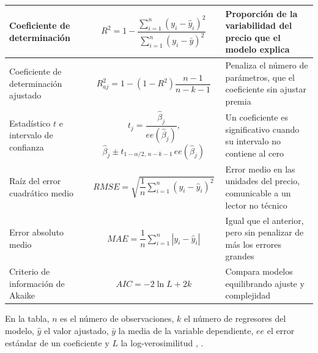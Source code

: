 \begin{strip}
\begin{center}
\begin{tabular}{|>{\raggedright\arraybackslash}p{3.3cm}|c|
                                >{\raggedright\arraybackslash}p{5.2cm}|}
                    \hline
                    Coeficiente de determinación &
                    $R^{2} = 1 - \dfrac{\sum_{i=1}^{n} (y_{i} - \hat{y}_{i})^{2}}
                    {\sum_{i=1}^{n} (y_{i} - \bar{y})^{2}}$ &
                    Proporción de la variabilidad del precio que el modelo
                    explica \\
                    \hline
                    Coeficiente de determinación ajustado &
                    $R^{2}_{aj} = 1 - (1 - R^{2}) \dfrac{n - 1}{n - k - 1}$ &
                    Penaliza el número de parámetros, que el coeficiente sin
                    ajustar premia \\
                    \hline
                    Estadístico $t$ e intervalo de confianza &
                    $t_{j} = \dfrac{\hat{\beta}_{j}}{ee(\hat{\beta}_{j})}$, \quad
                    $\hat{\beta}_{j} \pm t_{1-\alpha/2,\,n-k-1}\,
                    ee(\hat{\beta}_{j})$ &
                    Un coeficiente es significativo cuando su intervalo no contiene
                    al cero \\
                    \hline
                    Raíz del error cuadrático medio &
                    $RMSE = \sqrt{\dfrac{1}{n} \sum_{i=1}^{n}
                    (y_{i} - \hat{y}_{i})^{2}}$ &
                    Error medio en las unidades del precio, comunicable a un lector
                    no técnico \\
                    \hline
                    Error absoluto medio &
                    $MAE = \dfrac{1}{n} \sum_{i=1}^{n} |y_{i} - \hat{y}_{i}|$ &
                    Igual que el anterior, pero sin penalizar de más los errores
                    grandes \\
                    \hline
                    Criterio de información de Akaike &
                    $AIC = -2 \ln L + 2k$ &
                    Compara modelos equilibrando ajuste y complejidad \\
                    \hline
                \end{tabular}
            \end{center}
        \end{strip}

        En la tabla, $n$ es el número de observaciones, $k$ el número de
        regresores del modelo, $\hat{y}$ el valor ajustado, $\bar{y}$ la media de
        la variable dependiente, $ee$ el error estándar de un coeficiente y $L$ la
        log-verosimilitud \cite{akaike1974new}, \cite{triola2018estadistica}.

